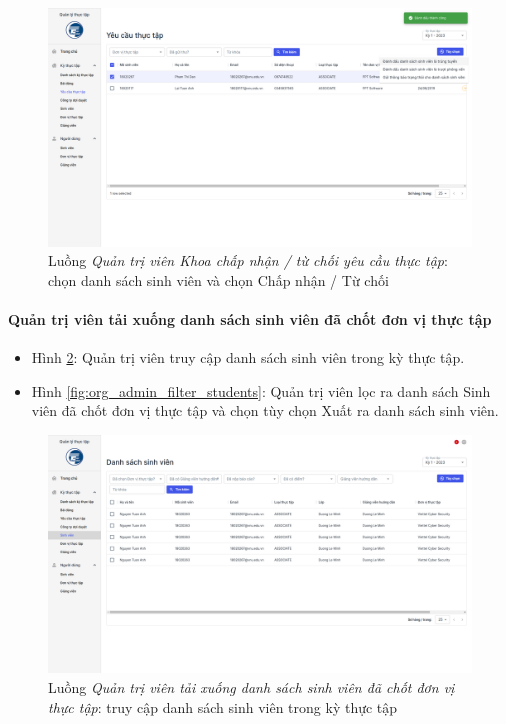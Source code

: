 \documentclass[./../main.tex]{subfiles}
\begin{document}
\begin{figure}[]
	\includegraphics[width=\linewidth]{./images/image73.png}
	\caption{Luồng \emph{Quản trị viên Khoa chấp nhận / từ chối yêu cầu thực tập}: chọn danh sách sinh viên và chọn Chấp nhận / Từ chối}
	\label{fig:org_admin_select_requests}
\end{figure}

\paragraph*{Quản trị viên tải xuống danh sách sinh viên đã chốt đơn vị thực tập}

\begin{itemize}
	\item Hình \ref{fig:org_admin_access_list_intern_students}: Quản trị viên truy cập danh sách sinh viên trong kỳ thực tập. 
	\item Hình \ref{fig:org_admin_filter_students}: Quản trị viên lọc ra danh sách Sinh viên đã chốt đơn vị thực tập và chọn tùy chọn Xuất ra danh sách sinh viên.
\end{itemize}

\begin{figure}[]
	\includegraphics[width=\linewidth]{./images/image75.png}
	\caption{Luồng \emph{Quản trị viên tải xuống danh sách sinh viên đã chốt đơn vị thực tập}: truy cập danh sách sinh viên trong kỳ thực tập}
	\label{fig:org_admin_access_list_intern_students}
\end{figure}
\end{document}
